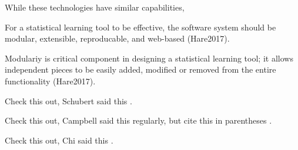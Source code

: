 \documentclass{tise_style}
\begin{document}
While these technologies have similar capabilities, 

For a statistical learning tool to be effective, the software system should be modular, extensible, reproducable, and web-based (Hare2017). 

Modulariy is critical component in designing a statistical learning tool; it allows independent pieces to be easily added, modified or removed from the entire functionality (Hare2017). 


Check this out, Schubert said this \cite{Schubert13}.


Check this out, Campbell said this \cite{Campbell02} regularly, but cite this in parentheses \citep{Campbell02}.


Check this out, Chi said this \cite{Chi81}.




\end{document}
